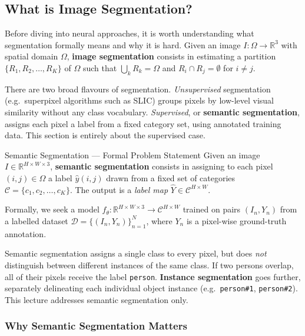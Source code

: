 \documentclass[11pt,a4paper]{article}
\newcommand{\term}[1]{\textcolor{DefGreen}{\textbf{#1}}}
\begin{document}
\subsection{What is Image Segmentation?}

Before diving into neural approaches, it is worth understanding what segmentation formally means and why it is hard. Given an image $I : \Omega \to \mathbb{R}^3$ with spatial domain $\Omega$, \term{image segmentation} consists in estimating a partition $\{R_1, R_2, \ldots, R_K\}$ of $\Omega$ such that $\bigcup_k R_k = \Omega$ and $R_i \cap R_j = \emptyset$ for $i \neq j$.

There are two broad flavours of segmentation. \emph{Unsupervised} segmentation (e.g.\ superpixel algorithms such as SLIC) groups pixels by low-level visual similarity without any class vocabulary. \emph{Supervised}, or \term{semantic segmentation}, assigns each pixel a label from a fixed category set, using annotated training data. This section is entirely about the supervised case.

\begin{defbox}{Semantic Segmentation — Formal Problem Statement}
Given an image $I \in \mathbb{R}^{H \times W \times 3}$, \textbf{semantic segmentation} consists in assigning to each pixel $(i,j) \in \Omega$ a label $\hat{y}(i,j)$ drawn from a fixed set of categories $\mathcal{C} = \{c_1, c_2, \ldots, c_K\}$. The output is a \emph{label map} $\hat{Y} \in \mathcal{C}^{H \times W}$.

Formally, we seek a model $f_\theta : \mathbb{R}^{H\times W\times 3} \to \mathcal{C}^{H\times W}$ trained on pairs $(I_n, Y_n)$ from a labelled dataset $\mathcal{D} = \{(I_n, Y_n)\}_{n=1}^N$, where $Y_n$ is a pixel-wise ground-truth annotation.
\end{defbox}

\begin{notebox}
Semantic segmentation assigns a single class to every pixel, but does \emph{not} distinguish between different instances of the same class. If two persons overlap, all of their pixels receive the label \texttt{person}. \term{Instance segmentation} goes further, separately delineating each individual object instance (e.g.\ \texttt{person\#1}, \texttt{person\#2}). This lecture addresses semantic segmentation only.
\end{notebox}

\subsubsection{Why Semantic Segmentation Matters}
\end{document}
